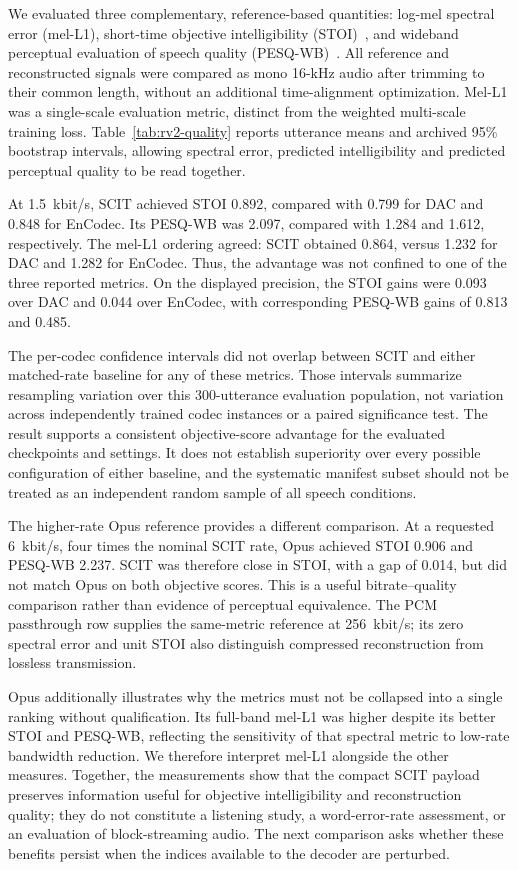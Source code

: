 

We evaluated three complementary, reference-based quantities: log-mel spectral error (mel-L1), short-time objective intelligibility (STOI)~\cite{stoi}, and wideband perceptual evaluation of speech quality (PESQ-WB)~\cite{pesq}. All reference and reconstructed signals were compared as mono 16-kHz audio after trimming to their common length, without an additional time-alignment optimization. Mel-L1 was a single-scale evaluation metric, distinct from the weighted multi-scale training loss. Table~\ref{tab:rv2-quality} reports utterance means and archived 95\% bootstrap intervals, allowing spectral error, predicted intelligibility and predicted perceptual quality to be read together.

At 1.5~kbit/s, SCIT achieved STOI 0.892, compared with 0.799 for DAC and 0.848 for EnCodec. Its PESQ-WB was 2.097, compared with 1.284 and 1.612, respectively. The mel-L1 ordering agreed: SCIT obtained 0.864, versus 1.232 for DAC and 1.282 for EnCodec. Thus, the advantage was not confined to one of the three reported metrics. On the displayed precision, the STOI gains were 0.093 over DAC and 0.044 over EnCodec, with corresponding PESQ-WB gains of 0.813 and 0.485.

The per-codec confidence intervals did not overlap between SCIT and either matched-rate baseline for any of these metrics. Those intervals summarize resampling variation over this 300-utterance evaluation population, not variation across independently trained codec instances or a paired significance test. The result supports a consistent objective-score advantage for the evaluated checkpoints and settings. It does not establish superiority over every possible configuration of either baseline, and the systematic manifest subset should not be treated as an independent random sample of all speech conditions.

The higher-rate Opus reference provides a different comparison. At a requested 6~kbit/s, four times the nominal SCIT rate, Opus achieved STOI 0.906 and PESQ-WB 2.237. SCIT was therefore close in STOI, with a gap of 0.014, but did not match Opus on both objective scores. This is a useful bitrate--quality comparison rather than evidence of perceptual equivalence. The PCM passthrough row supplies the same-metric reference at 256~kbit/s; its zero spectral error and unit STOI also distinguish compressed reconstruction from lossless transmission.

Opus additionally illustrates why the metrics must not be collapsed into a single ranking without qualification. Its full-band mel-L1 was higher despite its better STOI and PESQ-WB, reflecting the sensitivity of that spectral metric to low-rate bandwidth reduction. We therefore interpret mel-L1 alongside the other measures. Together, the measurements show that the compact SCIT payload preserves information useful for objective intelligibility and reconstruction quality; they do not constitute a listening study, a word-error-rate assessment, or an evaluation of block-streaming audio. The next comparison asks whether these benefits persist when the indices available to the decoder are perturbed.

